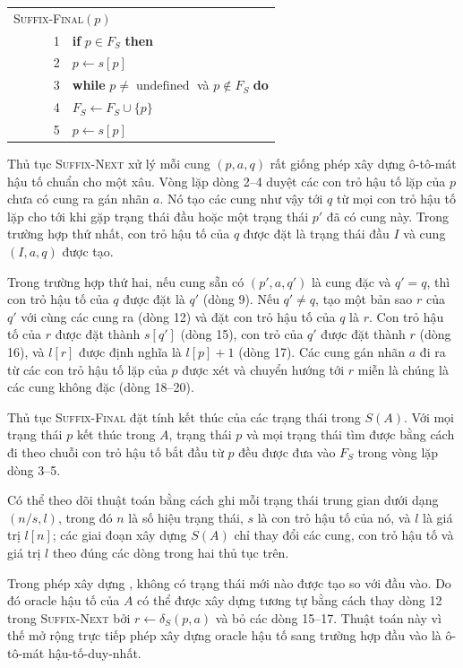 \documentclass[11pt]{article}
\newcommand{\undefinedsym}{\operatorname{undefined}}
\begin{document}
\begin{center}
\begin{tabular}{r p{0.78\linewidth}}
\multicolumn{2}{l}{\textsc{Suffix-Final}$(p)$}\\
1 & \textbf{if} $p\in F_S$ \textbf{then}\\
2 & \quad $p\leftarrow s[p]$\\
3 & \textbf{while} $p\ne\undefinedsym$ và $p\notin F_S$ \textbf{do}\\
4 & \quad $F_S\leftarrow F_S\cup\{p\}$\\
5 & \quad $p\leftarrow s[p]$
\end{tabular}
\end{center}

Thủ tục \textsc{Suffix-Next} xử lý mỗi cung $(p,a,q)$ rất giống phép xây dựng
ô-tô-mát hậu tố chuẩn cho một xâu. Vòng lặp dòng 2--4 duyệt các con trỏ hậu
tố lặp của $p$ chưa có cung ra gán nhãn $a$. Nó tạo các cung như vậy tới $q$
từ mọi con trỏ hậu tố lặp cho tới khi gặp trạng thái đầu hoặc một trạng thái
$p'$ đã có cung này. Trong trường hợp thứ nhất, con trỏ hậu tố của $q$ được
đặt là trạng thái đầu $I$ và cung $(I,a,q)$ được tạo.

Trong trường hợp thứ hai, nếu cung sẵn có $(p',a,q')$ là cung đặc và $q'=q$,
thì con trỏ hậu tố của $q$ được đặt là $q'$ (dòng 9). Nếu $q'\ne q$, tạo một
bản sao $r$ của $q'$ với cùng các cung ra (dòng 12) và đặt con trỏ hậu tố của
$q$ là $r$. Con trỏ hậu tố của $r$ được đặt thành $s[q']$ (dòng 15), con trỏ
của $q'$ được đặt thành $r$ (dòng 16), và $l[r]$ được định nghĩa là $l[p]+1$
(dòng 17). Các cung gán nhãn $a$ đi ra từ các con trỏ hậu tố lặp của $p$ được
xét và chuyển hướng tới $r$ miễn là chúng là các cung không đặc (dòng 18--20).

Thủ tục \textsc{Suffix-Final} đặt tính kết thúc của các trạng thái trong
$S(A)$. Với mọi trạng thái $p$ kết thúc trong $A$, trạng thái $p$ và mọi trạng
thái tìm được bằng cách đi theo chuỗi con trỏ hậu tố bắt đầu từ $p$ đều được
đưa vào $F_S$ trong vòng lặp dòng 3--5.

Có thể theo dõi thuật toán bằng cách ghi mỗi trạng thái trung gian dưới dạng
$(n/s,l)$, trong đó $n$ là số hiệu trạng thái, $s$ là con trỏ hậu tố của nó,
và $l$ là giá trị $l[n]$; các giai đoạn xây dựng $S(A)$ chỉ thay đổi các cung,
con trỏ hậu tố và giá trị $l$ theo đúng các dòng trong hai thủ tục trên.

Trong phép xây dựng  \cite{allauzen-oracle}, không có
trạng thái mới nào được tạo so với đầu vào. Do đó oracle hậu tố của $A$ có thể
được xây dựng tương tự bằng cách thay dòng 12 trong \textsc{Suffix-Next} bởi
$r\leftarrow\delta_S(p,a)$ và bỏ các dòng 15--17. Thuật toán này vì thế mở
rộng trực tiếp phép xây dựng oracle hậu tố sang trường hợp đầu vào là
ô-tô-mát hậu-tố-duy-nhất.
\end{document}
